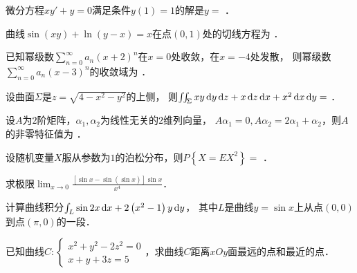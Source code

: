 \documentclass[plain,noanswer,medmath]{../../template/jnuexam}
\begin{document}


\begin{problem}
微分方程$xy' + y = 0$满足条件$y(1) = 1$的解是$y =$ \fillin{}．
\end{problem}


\begin{problem}
曲线$\sin (xy) + \ln (y - x) = x$在点$\left(0,1 \right)$处的切线方程为 \fillin{}．
\end{problem}


\begin{problem}
已知幂级数$\sum_{n = 0}^{\infty}a_n \left(x + 2 \right)^n$在$x = 0$处收敛，在$x = - 4$处发散，
则幂级数\goodbreak$\sum_{n = 0}^{\infty}a_n (x - 3)^n$的收敛域为 \fillin{}．
\end{problem}


\begin{problem}
设曲面$\Sigma$是$z = \sqrt{4 - x^2 - y^2}$的上侧，
则$\iint_{\Sigma}xy\mathop{}\!\mathrm{d} y\mathop{}\!\mathrm{d} z + x\mathop{}\!\mathrm{d} z\mathop{}\!\mathrm{d} x + x^2 \mathop{}\!\mathrm{d} x\mathop{}\!\mathrm{d} y =$ \fillin{}．
\end{problem}


\begin{problem}
设$A$为$2$阶矩阵，$\alpha_1,\alpha_2$为线性无关的$2$维列向量，
$A\alpha_1 = 0,A\alpha_2 = 2\alpha_1 + \alpha_2$，则$A$的非零特征值为 \fillin{}．
\end{problem}


\begin{problem}
设随机变量$X$服从参数为$1$的泊松分布，则$P\left\{X = EX^2 \right\} =$ \fillin{}．
\end{problem}




\begin{problem}[points=9]
求极限$\lim_{x \to 0} \frac{\left[\sin x - \sin \left(\sin x \right) \right]\sin x}{x^4}$．
\end{problem}


\begin{problem}[points=9]
计算曲线积分$\int_L \sin 2x\mathop{}\!\mathrm{d} x + 2\left(x^2 - 1 \right)y\mathop{}\!\mathrm{d} y$，
其中$L$是曲线$y = \sin x$上从点$\left(0,0 \right)$到点$\left(\pi ,0 \right)$的一段．
\end{problem}


\begin{problem}[points=11]
已知曲线$C:\begin{cases}
  x^2 + y^2 - 2z^2 = 0 \\
  x + y + 3z = 5
\end{cases}$，求曲线$C$距离$xOy$面最远的点和最近的点．
\end{problem}
\end{document}
